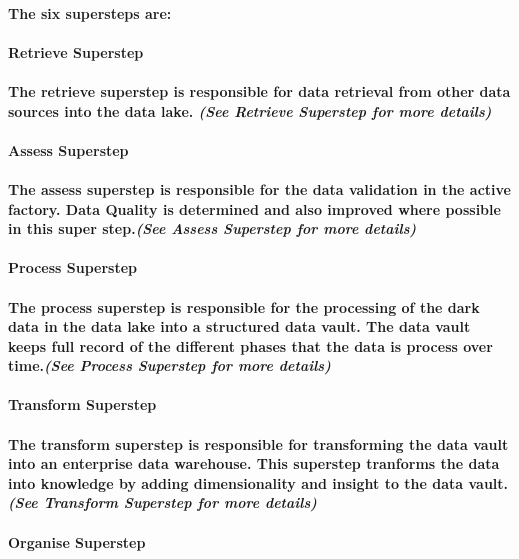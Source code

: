 \documentclass{acm_proc_article-sp}
\begin{document}
\paragraph{The six supersteps are:}
\paragraph{\textbf{Retrieve Superstep}}
\paragraph{The retrieve superstep is responsible for data retrieval from other data sources into the data lake. \textit{(See Retrieve Superstep for more details)}}
\paragraph{\textbf{Assess Superstep}}
\paragraph{The assess superstep is responsible for the data validation in the active factory. Data Quality is determined and also improved where possible in this super step.\textit{(See Assess Superstep for more details)}}
\paragraph{\textbf{Process Superstep}}
\paragraph{The process superstep is responsible for the processing of the dark data in the data lake into a structured data vault. The data vault keeps full record of the different phases that the data is process over time.\textit{(See Process Superstep for more details)}}
\paragraph{\textbf{Transform Superstep}}
\paragraph{The transform superstep is responsible for transforming the data vault into an enterprise data warehouse. This superstep tranforms the data into knowledge by adding dimensionality and insight to the data vault.\textit{(See Transform Superstep for more details)}}
\paragraph{\textbf{Organise Superstep}}
\end{document}
